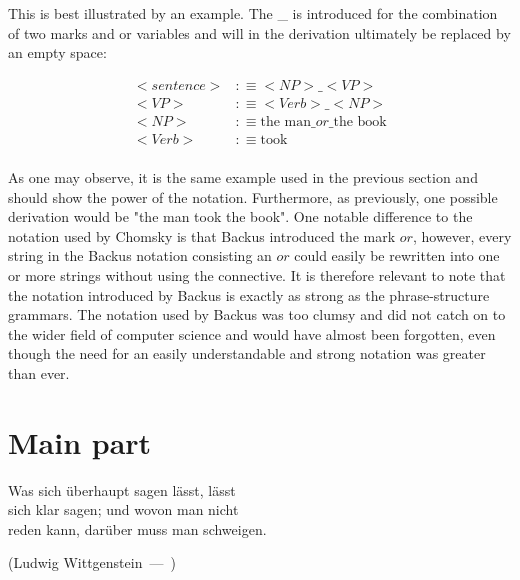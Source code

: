 \documentclass{article}
\let\oldquote\quote
\let\endoldquote\endquote
\renewenvironment{quote}[2][]
{\if\relax\detokenize{#1}\relax
	\def\quoteauthor{#2}%
	\else
	\def\quoteauthor{#2~---~#1}%
	\fi
	\oldquote}
{\par\nobreak\smallskip\hfill(\quoteauthor)%
	\endoldquote\addvspace{\bigskipamount}}
\begin{document}
This is best illustrated by an example. The \_ is introduced for the combination of two marks and\/ or variables and will in the derivation ultimately be replaced by an empty space:

\begin{equation} \label{eq2}
	\begin{split}
		<sentence> &:\equiv<NP>\_<VP> \\
		<VP> &:\equiv<Verb>\_<NP > \\
		<NP> &:\equiv\text{the man}\_or\_\text{the book} \\
		<Verb> &:\equiv\text{took} \\
	\end{split}
\end{equation}

As one may observe, it is the same example used in the previous section and should show the power of the notation. Furthermore, as previously, one possible derivation would be "the man took the book". One notable difference to the notation used by Chomsky is that Backus introduced the mark $or$, however, every string in the Backus notation consisting an $or$ could easily be rewritten into one or more strings without using the connective. It is therefore relevant to note that the notation introduced by Backus is exactly as strong as the phrase-structure grammars. The notation used by Backus was too clumsy and did not catch on to the wider field of computer science and would have almost been forgotten, even though the need for an easily understandable and strong notation was greater than ever.

\section{Main part}

\begin{quote}{Ludwig Wittgenstein}
	\begin{flushright}
		Was sich überhaupt sagen lässt, lässt \\ sich klar sagen; und wovon man nicht \\ reden kann, darüber muss man schweigen.
	\end{flushright}
\end{quote}
\end{document}
